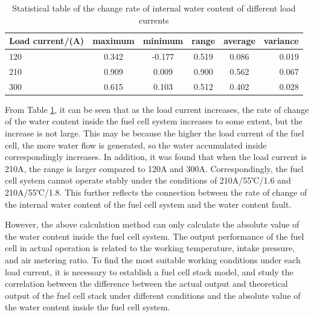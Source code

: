 \begin{table}
	\centering
	\begin{center}
		\caption{Statistical table of the change rate of internal water content of different load currents}
		\label{tab:StatisticalTable}
		\begin{tabular}{l|c|c|c|c|r}
			\hline
			\textbf{Load current/(A)} & \textbf{maximum} & \textbf{minimum} & \textbf{range} & \textbf{average} & \textbf{variance} \\
			\hline
			120                       & 0.342            & -0.177           & 0.519          & 0.086            & 0.019             \\
			210                       & 0.909            & 0.009            & 0.900          & 0.562            & 0.067             \\
			300                       & 0.615            & 0.103            & 0.512          & 0.402            & 0.028             \\
			\hline
		\end{tabular}
	\end{center}
\end{table}
From Table \ref{tab:StatisticalTable}, it can be seen that as the load current increases, the rate of change of the water content inside the fuel cell system increases to some extent, but the increase is not large. This may be because the higher the load current of the fuel cell, the more water flow is generated, so the water accumulated inside correspondingly increases. In addition, it was found that when the load current is 210A, the range is larger compared to 120A and 300A. Correspondingly, the fuel cell system cannot operate stably under the conditions of 210A/55℃/1.6 and 210A/55℃/1.8. This further reflects the connection between the rate of change of the internal water content of the fuel cell system and the water content fault.
\par
However, the above calculation method can only calculate the absolute value of the water content inside the fuel cell system. The output performance of the fuel cell in actual operation is related to the working temperature, intake pressure, and air metering ratio. To find the most suitable working conditions under each load current, it is necessary to establish a fuel cell stack model, and study the correlation between the difference between the actual output and theoretical output of the fuel cell stack under different conditions and the absolute value of the water content inside the fuel cell system.
